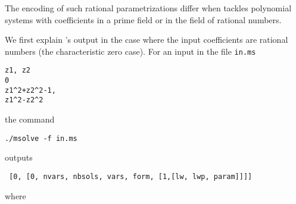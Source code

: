 \documentclass[a4paper,english,11pt]{scrartcl}
\theoremstyle{definition}
\theoremstyle{remark}
\begin{document}
The encoding of such rational parametrizations differ when \msolve tackles 
polynomial systems with coefficients in a prime field or in the field of rational 
numbers.

We first explain \msolve's output in the case where the input coefficients are 
rational numbers (the characteristic zero case).
For an input in the file \verb+in.ms+
\begin{tcolorbox}
\begin{verbatim}
z1, z2
0
z1^2+z2^2-1,
z1^2-z2^2
\end{verbatim}
\end{tcolorbox}
the command
\begin{tcolorbox}
\begin{verbatim}
./msolve -f in.ms
\end{verbatim}
\end{tcolorbox}
\msolve outputs
\begin{verbatim}
 [0, [0, nvars, nbsols, vars, form, [1,[lw, lwp, param]]]]
\end{verbatim}
where
\end{document}
